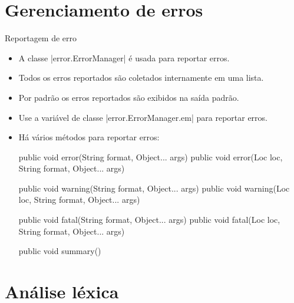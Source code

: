 \documentclass[smaller]{beamer}
\begin{document}
\section{Gerenciamento de erros}

\begin{frame}{Reportagem de erro}
  \begin{itemize}
    \item A classe \pyginline|error.ErrorManager| é usada para
    reportar erros.
    \item Todos os erros reportados são coletados internamente em uma
    lista.
    \item Por padrão os erros reportados são exibidos na saída padrão.
    \item Use a variável de classe \pyginline|error.ErrorManager.em|
    para reportar erros.
    \item Há vários métodos para reportar erros:
\begin{pygmented}[]
   public void error(String format, Object... args)
   public void error(Loc loc, String format, Object... args)

   public void warning(String format, Object... args)
   public void warning(Loc loc, String format, Object... args)

   public void fatal(String format, Object... args)
   public void fatal(Loc loc, String format, Object... args)

   public void summary()
\end{pygmented}
  \end{itemize}
\end{frame}


\section{Análise léxica}
\end{document}
